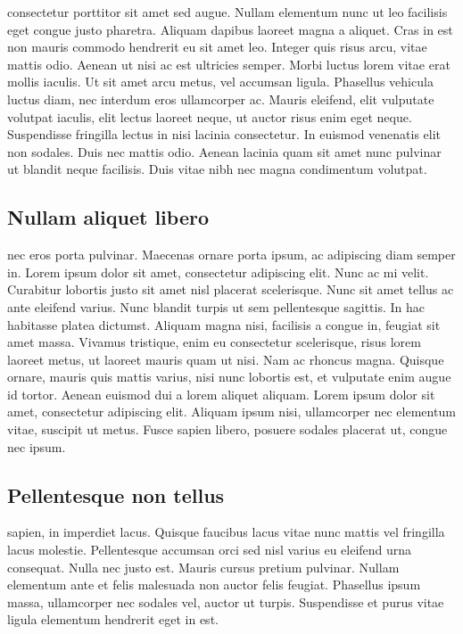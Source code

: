 \documentclass[]{article}
\begin{document}
consectetur porttitor sit amet sed augue. Nullam elementum nunc ut leo
facilisis eget congue justo pharetra. Aliquam dapibus laoreet magna a
aliquet. Cras in est non mauris commodo hendrerit eu sit amet leo.
Integer quis risus arcu, vitae mattis odio. Aenean ut nisi ac est
ultricies semper. Morbi luctus lorem vitae erat mollis iaculis. Ut sit
amet arcu metus, vel accumsan ligula. Phasellus vehicula luctus diam,
nec interdum eros ullamcorper ac. Mauris eleifend, elit vulputate
volutpat iaculis, elit lectus laoreet neque, ut auctor risus enim eget
neque. Suspendisse fringilla lectus in nisi lacinia consectetur. In
euismod venenatis elit non sodales. Duis nec mattis odio. Aenean lacinia
quam sit amet nunc pulvinar ut blandit neque facilisis. Duis vitae nibh
nec magna condimentum volutpat.

\hypertarget{nullam-aliquet-libero}{%
\subsection{Nullam aliquet libero}\label{nullam-aliquet-libero}}

nec eros porta pulvinar. Maecenas ornare porta ipsum, ac adipiscing diam
semper in. Lorem ipsum dolor sit amet, consectetur adipiscing elit. Nunc
ac mi velit. Curabitur lobortis justo sit amet nisl placerat
scelerisque. Nunc sit amet tellus ac ante eleifend varius. Nunc blandit
turpis ut sem pellentesque sagittis. In hac habitasse platea dictumst.
Aliquam magna nisi, facilisis a congue in, feugiat sit amet massa.
Vivamus tristique, enim eu consectetur scelerisque, risus lorem laoreet
metus, ut laoreet mauris quam ut nisi. Nam ac rhoncus magna. Quisque
ornare, mauris quis mattis varius, nisi nunc lobortis est, et vulputate
enim augue id tortor. Aenean euismod dui a lorem aliquet aliquam. Lorem
ipsum dolor sit amet, consectetur adipiscing elit. Aliquam ipsum nisi,
ullamcorper nec elementum vitae, suscipit ut metus. Fusce sapien libero,
posuere sodales placerat ut, congue nec ipsum.

\hypertarget{pellentesque-non-tellus}{%
\subsection{Pellentesque non tellus}\label{pellentesque-non-tellus}}

sapien, in imperdiet lacus. Quisque faucibus lacus vitae nunc mattis vel
fringilla lacus molestie. Pellentesque accumsan orci sed nisl varius eu
eleifend urna consequat. Nulla nec justo est. Mauris cursus pretium
pulvinar. Nullam elementum ante et felis malesuada non auctor felis
feugiat. Phasellus ipsum massa, ullamcorper nec sodales vel, auctor ut
turpis. Suspendisse et purus vitae ligula elementum hendrerit eget in
est.
\end{document}
